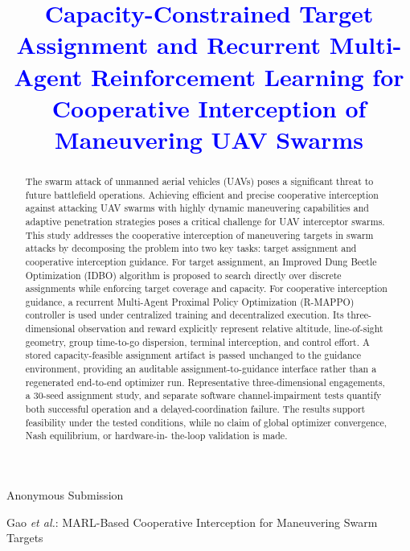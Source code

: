 \documentclass[lettersize,journal]{IEEEtran}
\begin{document}
\title{\textcolor{blue}{Capacity-Constrained Target Assignment and Recurrent Multi-Agent Reinforcement Learning for Cooperative Interception of Maneuvering UAV Swarms}}


\author{}
%
{Anonymous Submission}

%
{Gao \MakeLowercase{\textit{et al.}}: MARL-Based Cooperative Interception for Maneuvering Swarm Targets}

\maketitle

\begin{abstract}\color{blue}
The swarm attack of unmanned aerial vehicles (UAVs) poses a significant threat to future
battlefield operations.
Achieving efficient and precise cooperative interception against attacking UAV swarms with
highly dynamic maneuvering capabilities and adaptive penetration strategies poses a critical
challenge for UAV interceptor swarms.
This study addresses the cooperative interception of maneuvering targets in swarm attacks by
decomposing the problem into two key tasks: target assignment and cooperative interception
guidance.
For target assignment, an Improved Dung Beetle Optimization (IDBO) algorithm is proposed to
search directly over discrete assignments while enforcing target coverage and capacity.
For cooperative interception guidance, a recurrent Multi-Agent Proximal Policy Optimization
(R-MAPPO) controller is used under centralized training and decentralized execution. Its
three-dimensional observation and reward explicitly represent relative altitude, line-of-sight
geometry, group time-to-go dispersion, terminal interception, and control effort. A stored
capacity-feasible assignment artifact is passed unchanged to the guidance environment,
providing an auditable assignment-to-guidance interface rather than a regenerated end-to-end
optimizer run. Representative three-dimensional engagements, a 30-seed
assignment study, and separate software channel-impairment tests quantify both successful
operation and a delayed-coordination failure. The results support feasibility under the tested
conditions, while no claim of global optimizer convergence, Nash equilibrium, or hardware-in-
the-loop validation is made.
\end{abstract}
\end{document}
